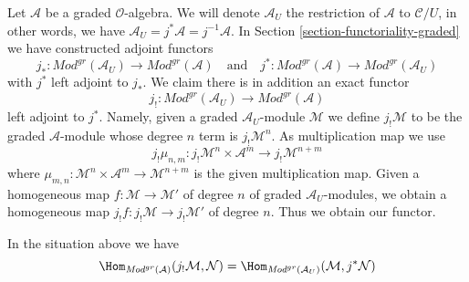 \medskip\noindent
Let $\mathcal{A}$ be a graded $\mathcal{O}$-algebra.
We will denote $\mathcal{A}_U$ the restriction of $\mathcal{A}$
to $\mathcal{C}/U$, in other words, we have
$\mathcal{A}_U = j^*\mathcal{A} = j^{-1}\mathcal{A}$.
In Section \ref{section-functoriality-graded}
we have constructed adjoint functors
$$
j_* :
\textit{Mod}^{gr}(\mathcal{A}_U)
\longrightarrow
\textit{Mod}^{gr}(\mathcal{A})
\quad\text{and}\quad
j^* :
\textit{Mod}^{gr}(\mathcal{A})
\longrightarrow
\textit{Mod}^{gr}(\mathcal{A}_U)
$$
with $j^*$ left adjoint to $j_*$. We claim there is in addition an
exact functor
$$
j_! :
\textit{Mod}^{gr}(\mathcal{A}_U)
\longrightarrow
\textit{Mod}^{gr}(\mathcal{A})
$$
left adjoint to $j^*$. Namely, given a graded $\mathcal{A}_U$-module
$\mathcal{M}$ we define $j_!\mathcal{M}$ to be the graded $\mathcal{A}$-module
whose degree $n$ term is $j_!\mathcal{M}^n$. As multiplication map
we use
$$
j_!\mu_{n, m} :
j_!\mathcal{M}^n \times \mathcal{A}^m \to
j_!\mathcal{M}^{n + m}
$$
where $\mu_{m, n} : \mathcal{M}^n \times \mathcal{A}^m \to \mathcal{M}^{n + m}$
is the given multiplication map. Given a homogeneous map
$f : \mathcal{M} \to \mathcal{M}'$ of degree $n$ of graded
$\mathcal{A}_U$-modules, we obtain a homogeneous map
$j_!f : j_!\mathcal{M} \to j_!\mathcal{M}'$ of degree $n$.
Thus we obtain our functor.

\begin{lemma}
\label{lemma-extension-by-zero-graded}
In the situation above we have
$$
\Hom_{\textit{Mod}^{gr}(\mathcal{A})}(
j_!\mathcal{M}, \mathcal{N}) =
\Hom_{\textit{Mod}^{gr}(\mathcal{A}_U)}(
\mathcal{M}, j^*\mathcal{N})
$$
\end{lemma}

